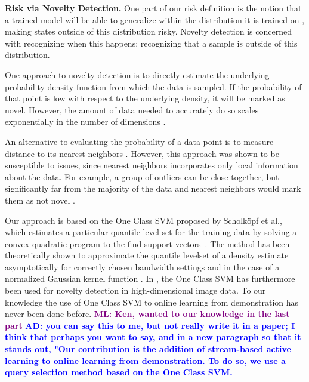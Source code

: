 \documentclass[10pt, conference]{ieeeconf}      %
\newcommand{\adnote}[1]{\ifthenelse{ \boolean{include-notes}}%
 {\textcolor{blue}{\textbf{AD: #1}}}{}}
\newcommand{\mlnote}[1]{\ifthenelse{ \boolean{include-notes}}%
 {\textcolor{purple}{\textbf{ML: #1}}}{}}
\begin{document}




\noindent\textbf{Risk via Novelty Detection.}
One part of our risk definition is the notion that a trained model will be able to generalize within the distribution it is
trained on \cite{tokdar2010importance}, making states outside of this distribution risky. Novelty detection \cite{hodge2004survey} is concerned with recognizing when this happens: recognizing that a sample is outside of this distribution.

One approach to novelty detection is to directly estimate the underlying probability density function from which the data is sampled. If the probability of that point is low with respect to the underlying density, it will be marked as novel. However, the amount of data needed to accurately do so scales exponentially in the number of dimensions \cite{nadaraya1964estimating}.

An alternative to evaluating the probability of a data point is to measure distance to its nearest neighbors \cite{knox1998algorithms}. However, this approach was shown to be
susceptible to issues, since nearest neighbors  incorporates only local information about the data. For example, a group of outliers can be close together, but significantly far from the majority of the data and nearest neighbors would mark them as not novel \cite{hodge2004survey}.

Our approach is based on the One Class SVM proposed by Scholk{\"o}pf et al., which estimates a particular quantile level set for the training data by solving a convex quadratic program  to the find support
vectors~\cite{scholkopf2001estimating}. The method has been theoretically shown to approximate the quantile levelset of a density estimate
asymptotically for correctly chosen bandwidth settings and in the case of a normalized Gaussian kernel function \cite{vert2006consistency}. 
In \cite{liu2014unsupervised}, the One Class SVM has furthermore been used for novelty detection in high-dimensional image data. To our knowledge the use of One Class SVM to online learning from demonstration has never been done before. \mlnote{Ken, wanted to our knowledge in the last part} \adnote{you can say this to me, but not really write it in a paper; I think that perhaps you want to say, and in a new paragraph so that it stands out, "Our contribution is the addition of stream-based active learning to online learning from demonstration. To do so, we use a query selection method based on the One Class SVM.}
\end{document}

